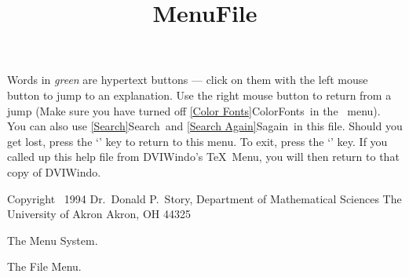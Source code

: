 Words in {\it green\/} are hypertext buttons --- click on them with
the left mouse button to jump to an explanation.  Use the right mouse button
to return from a 
jump  (Make sure you have turned off
\ref{Color Fonts}{ColorFonts}\ in the \ menu).
	\medskip
You can also use
\ref{Search}{Search}\ and \ref {Search Again}{Sagain}\ 
in this file.
	\medskip
Should you get lost, press the `' key to return to this menu.
	\medskip
To exit, press the `' key.  If you called up this help file
from DVIWindo's \TeX~Menu, you will then return to 
that copy of 
DVIWindo.
	\bigskip

\def\nl{\hfill\break}

Copyright \copyrght\ 1994 Dr.\ Donald P.\ Story,
    \medskip
Department of Mathematical Sciences \nl
The University of Akron \nl
Akron, OH  44325 \nl


\newpage

\title{Menu}The Menu System.

       
\newpage

\title{File}The File Menu.

